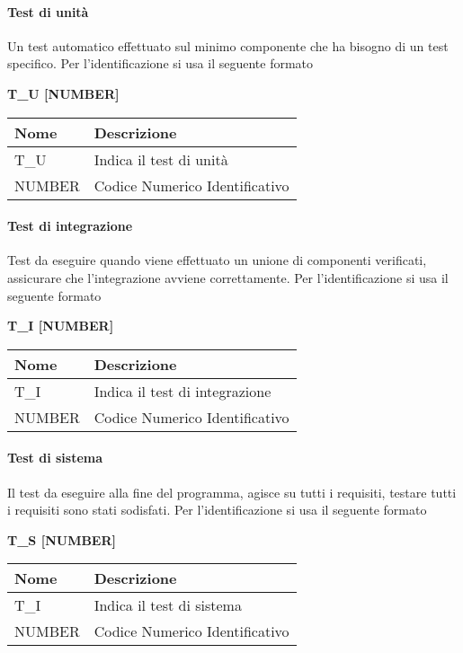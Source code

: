 \paragraph{Test di unità}
Un test automatico effettuato sul minimo componente che ha bisogno di un test specifico.\newline
Per l’identificazione si usa il seguente formato
\begin{center}
    \textbf{T\_U [NUMBER]}
\end{center}
\renewcommand{\arraystretch}{1.8} 
 \begin{tabular}{ |m{7em}|m{30em}| }
        \hline
        \textbf{Nome} & \textbf{Descrizione} \\
        \hline
            T\_U & Indica il test di unità \\
        \hline
            NUMBER & Codice Numerico Identificativo \\
        \hline
 \end{tabular}

\paragraph{Test di integrazione}
Test da eseguire quando viene effettuato un unione di componenti verificati, assicurare che l’integrazione avviene correttamente.\newline
Per l’identificazione si usa il seguente formato
\begin{center}
    \textbf{T\_I [NUMBER]}
\end{center}
\renewcommand{\arraystretch}{1.8} 
 \begin{tabular}{ |m{7em}|m{30em}| }
        \hline
        \textbf{Nome} & \textbf{Descrizione} \\
        \hline
            T\_I & Indica il test di integrazione \\
        \hline
            NUMBER & Codice Numerico Identificativo \\
        \hline
 \end{tabular}

\paragraph{Test di sistema}
Il test da eseguire alla fine del programma, agisce su tutti i requisiti, testare tutti i requisiti sono stati sodisfati.\newline
Per l’identificazione si usa il seguente formato
\begin{center}
    \textbf{T\_S [NUMBER]}
\end{center}
\renewcommand{\arraystretch}{1.8} 
 \begin{tabular}{ |m{7em}|m{30em}| }
        \hline
        \textbf{Nome} & \textbf{Descrizione} \\
        \hline
            T\_I & Indica il test di sistema \\
        \hline
            NUMBER & Codice Numerico Identificativo \\
        \hline
 \end{tabular}

